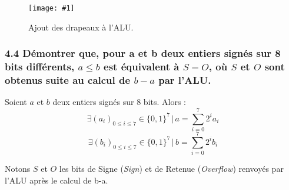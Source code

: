 \documentclass[twoside, 12pt, a4paper]{article}
\newcommand{\cf}[3]{
    \begin{figure}[!hbt]
        \centering
        \texttt{[image: \#1]}
    \caption{#3}\label{Fig:#1}
    \end{figure}
}
\newcommand{\hcf}[2]{\cf{#1}{.75}{#2}}
\begin{document}
\hcf{ALU_flags.png}{Ajout des drapeaux à l'ALU.}
        
        \subsubsection*{\textbf{4.4} Démontrer que, pour a et b deux entiers signés sur 8 bits différents, $a \leq b$ est équivalent à $S = O$, où $S$ et $O$ sont obtenus suite au calcul de $b-a$ par l'ALU.}
        Soient $a$ et $b$ deux entiers signés sur 8 bits.
        Alors :
        $$
        \exists (a_i)_{0\leq i \leq 7} \in \{0, 1\}^7 \, | \, a = \sum_{i=0}^7 2^i a_i
        $$
        $$
        \exists (b_i)_{0\leq i \leq 7} \in \{0, 1\}^7 \, | \, b = \sum_{i=0}^7 2^i b_i
        $$

        Notons $S$ et $O$ les bits de Signe (\textit{Sign}) et de Retenue (\textit{Overflow}) renvoyés par l'ALU après le calcul de b-a.
\end{document}
